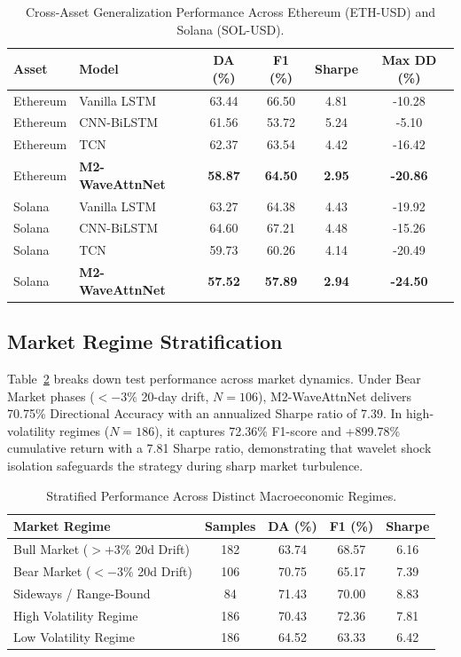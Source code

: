 \documentclass[journal]{IEEEtran}
\begin{document}
\begin{table}[ht]
\centering
\caption{Cross-Asset Generalization Performance Across Ethereum (ETH-USD) and Solana (SOL-USD).}
\label{tab:cross_asset}
\begin{tabular}{llcccc}
\toprule
\textbf{Asset} & \textbf{Model} & \textbf{DA (\%)} & \textbf{F1 (\%)} & \textbf{Sharpe} & \textbf{Max DD (\%)} \\
\midrule
Ethereum & Vanilla LSTM & 63.44 & 66.50 & 4.81 & -10.28 \\
Ethereum & CNN-BiLSTM & 61.56 & 53.72 & 5.24 & -5.10 \\
Ethereum & TCN & 62.37 & 63.54 & 4.42 & -16.42 \\
Ethereum & \textbf{M2-WaveAttnNet} & \textbf{58.87} & \textbf{64.50} & \textbf{2.95} & \textbf{-20.86} \\
\midrule
Solana & Vanilla LSTM & 63.27 & 64.38 & 4.43 & -19.92 \\
Solana & CNN-BiLSTM & 64.60 & 67.21 & 4.48 & -15.26 \\
Solana & TCN & 59.73 & 60.26 & 4.14 & -20.49 \\
Solana & \textbf{M2-WaveAttnNet} & \textbf{57.52} & \textbf{57.89} & \textbf{2.94} & \textbf{-24.50} \\
\bottomrule
\end{tabular}
\end{table}

\subsection{Market Regime Stratification}
Table~\ref{tab:regime_breakdown} breaks down test performance across market dynamics. Under Bear Market phases ($<-3\%$ 20-day drift, $N=106$), M2-WaveAttnNet delivers 70.75\% Directional Accuracy with an annualized Sharpe ratio of 7.39. In high-volatility regimes ($N=186$), it captures 72.36\% F1-score and +899.78\% cumulative return with a 7.81 Sharpe ratio, demonstrating that wavelet shock isolation safeguards the strategy during sharp market turbulence.

\begin{table}[ht]
\centering
\caption{Stratified Performance Across Distinct Macroeconomic Regimes.}
\label{tab:regime_breakdown}
\begin{tabular}{lcccc}
\toprule
\textbf{Market Regime} & \textbf{Samples} & \textbf{DA (\%)} & \textbf{F1 (\%)} & \textbf{Sharpe} \\
\midrule
Bull Market ($>+3\%$ 20d Drift) & 182 & 63.74 & 68.57 & 6.16 \\
Bear Market ($<-3\%$ 20d Drift) & 106 & 70.75 & 65.17 & 7.39 \\
Sideways / Range-Bound & 84 & 71.43 & 70.00 & 8.83 \\
High Volatility Regime & 186 & 70.43 & 72.36 & 7.81 \\
Low Volatility Regime & 186 & 64.52 & 63.33 & 6.42 \\
\bottomrule
\end{tabular}
\end{table}
\end{document}
